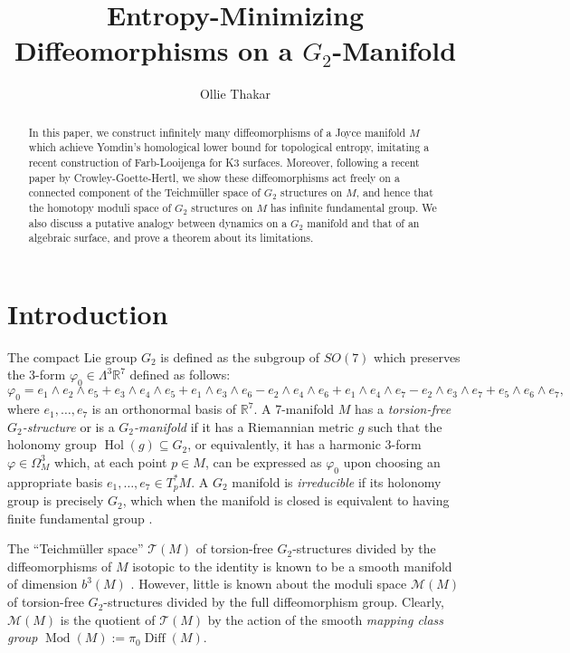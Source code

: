 \documentclass{amsart}
\title{Entropy-Minimizing Diffeomorphisms on a $G_2$-Manifold}
\author{Ollie Thakar}
\theoremstyle{theorem}
\theoremstyle{definition}
\theoremstyle{definition}
\theoremstyle{definition}
\theoremstyle{theorem}
\theoremstyle{theorem}
\theoremstyle{theorem}
\theoremstyle{corollary}
\theoremstyle{question}
\theoremstyle{remark}
\DeclareMathOperator{\Mod}{Mod}
\DeclareMathOperator{\Hol}{Hol}
\DeclareMathOperator{\Diff}{Diff}
\begin{document}
\maketitle

\begin{abstract}
    In this paper, we construct infinitely many diffeomorphisms of a Joyce manifold $M$ which achieve Yomdin's homological lower bound for topological entropy, imitating a recent construction of Farb-Looijenga for K3 surfaces. Moreover, following a recent paper by Crowley-Goette-Hertl, we show these diffeomorphisms act freely on a connected component of the Teichm\"uller space of $G_2$ structures on $M$, and hence that the homotopy moduli space of $G_2$ structures on $M$ has infinite fundamental group. We also discuss a putative analogy between dynamics on a $G_2$ manifold and that of an algebraic surface, and prove a theorem about its limitations. 
\end{abstract}

\section{Introduction}

The compact Lie group $G_2$ is defined as the subgroup of $SO(7)$ which preserves the 3-form $\varphi_0 \in \Lambda^3\mathbb{R}^7$ defined as follows: $$\varphi_0 = e_1\wedge e_2\wedge e_5+ e_3\wedge e_4\wedge e_5+e_1\wedge e_3\wedge e_6-e_2\wedge e_4\wedge e_6+e_1\wedge e_4\wedge e_7-e_2\wedge e_3\wedge e_7+e_5\wedge e_6\wedge e_7,$$ where $e_1,\dots, e_7$ is an orthonormal basis of $\mathbb{R}^7.$ A 7-manifold $M$ has a \emph{torsion-free $G_2$-structure} or is a \emph{$G_2$-manifold} if it has a Riemannian metric $g$ such that the holonomy group $\Hol(g) \subseteq G_2$, or equivalently, it has a harmonic 3-form $\varphi\in\Omega^3_M$ which, at each point $p\in M$, can be expressed as $\varphi_0$ upon choosing an appropriate basis $e_1,\dots, e_7\in T_p^*M.$ A $G_2$ manifold is \emph{irreducible} if its holonomy group is precisely $G_2$, which when the manifold is closed is equivalent to having finite fundamental group \cite{Joyce1}.

The ``Teichm\"uller space'' $\mathcal{T}(M)$ of torsion-free $G_2$-structures divided by the diffeomorphisms of $M$ isotopic to the identity is known to be a smooth manifold of dimension $b^3(M)$ \cite[Theorem C]{Joyce1}. However, little is known about the moduli space $\mathcal{M}(M)$ of torsion-free $G_2$-structures divided by the full diffeomorphism group. Clearly, $\mathcal{M}(M)$ is the quotient of $\mathcal{T}(M)$ by the action of the smooth \emph{mapping class group} $\Mod(M):=\pi_0\Diff(M).$
\end{document}
